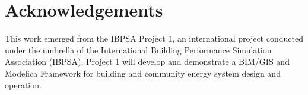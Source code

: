 \documentclass[10pt]{article}
\begin{document}
\section*{Acknowledgements}

This work emerged from the IBPSA Project 1, an international project conducted under the umbrella of the International Building Performance Simulation Association (IBPSA). Project 1 will develop and demonstrate a BIM/GIS and Modelica Framework for building and community energy system design and operation.





\end{document}
